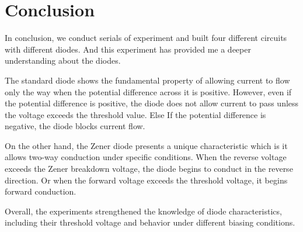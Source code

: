 \section{Conclusion}
    In conclusion, we conduct serials of experiment and built four different circuits with different diodes. And this experiment has provided me a deeper understanding about the diodes.\par
    The standard diode shows the fundamental property of allowing current to flow only the way when the potential difference across it is positive. However, even if the potential difference is positive, the diode does not allow current to pass unless the voltage exceeds the threshold value. Else If the potential difference is negative, the diode blocks current flow.\par
    On the other hand, the Zener diode presents a unique characteristic which is it allows two-way conduction under specific conditions. When the reverse voltage exceeds the Zener breakdown voltage, the diode begins to conduct in the reverse direction. Or when the forward voltage exceeds the threshold voltage, it begins forward conduction.\par
    Overall, the experiments strengthened the knowledge of diode characteristics, including their threshold voltage and behavior under different biasing conditions.